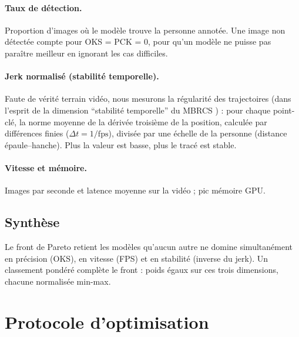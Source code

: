 \documentclass[11pt,a4paper]{report}
\begin{document}
\paragraph{Taux de détection.} Proportion d'images où le modèle trouve la personne annotée. Une image non détectée
compte pour OKS = PCK = 0, pour qu'un modèle ne puisse pas paraître meilleur en ignorant les cas difficiles.

\paragraph{Jerk normalisé (stabilité temporelle).} Faute de vérité terrain vidéo, nous mesurons la régularité des
trajectoires (dans l'esprit de la dimension \enquote{stabilité temporelle} du MBRCS \cite{fernandez2026mbrcs}) :
pour chaque point-clé, la norme moyenne de la dérivée troisième de la position, calculée par différences finies
($\Delta t = 1/\mathrm{fps}$), divisée par une échelle de la personne (distance épaule--hanche). Plus la valeur
est basse, plus le tracé est stable.

\paragraph{Vitesse et mémoire.} Images par seconde et latence moyenne sur la vidéo ; pic mémoire GPU.

\subsection{Synthèse}

Le front de Pareto retient les modèles qu'aucun autre ne domine simultanément en précision (OKS), en vitesse (FPS)
et en stabilité (inverse du jerk). Un classement pondéré complète le front : poids égaux sur ces trois
dimensions, chacune normalisée min-max.

\section{Protocole d'optimisation}
\label{sec:methodo-optim}
\end{document}
